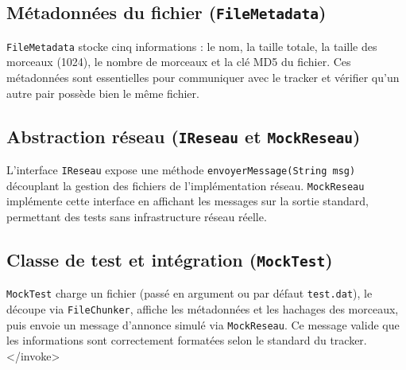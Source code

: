 \subsection{Métadonnées du fichier (\texttt{FileMetadata})}

\texttt{FileMetadata} stocke cinq informations : le nom, la taille totale, la taille des morceaux (1024), le nombre de morceaux et la clé MD5 du fichier. Ces métadonnées sont essentielles pour communiquer avec le tracker et vérifier qu'un autre pair possède bien le même fichier.

\subsection{Abstraction réseau (\texttt{IReseau} et \texttt{MockReseau})}

L'interface \texttt{IReseau} expose une méthode \texttt{envoyerMessage(String msg)} découplant la gestion des fichiers de l'implémentation réseau. \texttt{MockReseau} implémente cette interface en affichant les messages sur la sortie standard, permettant des tests sans infrastructure réseau réelle.

\subsection{Classe de test et intégration (\texttt{MockTest})}

\texttt{MockTest} charge un fichier (passé en argument ou par défaut \texttt{test.dat}), le découpe via \texttt{FileChunker}, affiche les métadonnées et les hachages des morceaux, puis envoie un message d'annonce simulé via \texttt{MockReseau}. Ce message valide que les informations sont correctement formatées selon le standard du tracker.
</invoke>